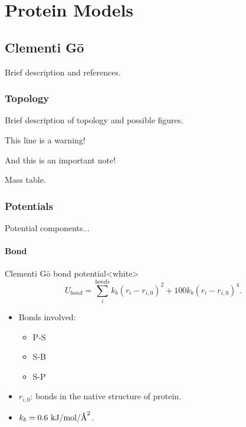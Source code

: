 \chapter{Protein Models}
\label{chap:protein}


\section{Clementi G\={o}}
\label{sec:protein_cc_go}

\todo{} Brief description and references.

\subsection{Topology}
\label{subsec:protein_cc_go_top}

\todo{} Brief description of topology and possible figures.

\warning{} This line is a warning!

\note{} And this is an important note!

\todo{} Mass table.


\subsection{Potentials}
\label{subsec:protein_cc_go_potential}

\todo{} Potential components...

\subsubsection{Bond}
\label{sec:protein_cc_go_potential_bond}

\begin{smallpage}{Clementi G\={o} bond potential}<white>
  \begin{equation}
    \label{eq:protein_cc_go_local_bond}
    U_{bond} = \sum_{i}^{bonds} k_b (r_i - r_{i,0})^2 + 100 k_b (r_i - r_{i,0})^4.
  \end{equation}
  \tcblower
  \begin{itemize}
  \item Bonds involved:
    \begin{itemize}
    \item P-S
    \item S-B
    \item S-P
    \end{itemize}
  \item $r_{i, 0}$: bonds in the native structure of protein.
  \item $k_b = 0.6\ \mathrm{kJ/mol/\angstrom^2}$.
  \end{itemize}
\end{smallpage}



